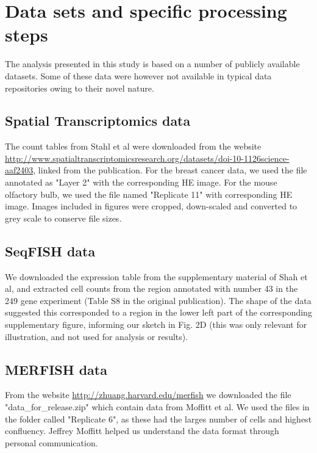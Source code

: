 \section{Data sets and specific processing steps}
The analysis presented in this study is based on a number of publicly available datasets. Some of these data were however not available in typical data repositories owing to their novel nature.

\subsection{Spatial Transcriptomics data}

\begin{sloppypar}
The count tables from Stahl et al were downloaded from the website \url{http://www.spatialtranscriptomicsresearch.org/datasets/doi-10-1126science-aaf2403}, linked from the publication. For the breast cancer data, we used the file annotated as "Layer 2" with the corresponding HE image. For the mouse olfactory bulb, we used the file named "Replicate 11" with corresponding HE image. Images included in figures were cropped, down-scaled and converted to grey scale to conserve file sizes.
\end{sloppypar}

\subsection{SeqFISH data}

We downloaded the expression table from the supplementary material of Shah et al, and extracted cell counts from the region annotated with number 43 in the 249 gene experiment (Table S8 in the original publication). The shape of the data suggested this corresponded to a region in the lower left part of the corresponding supplementary figure, informing our sketch in Fig. 2D (this was only relevant for illustration, and not used for analysis or results).

\subsection{MERFISH data}

From the website \url{http://zhuang.harvard.edu/merfish} we downloaded the file "data\_for\_release.zip" which contain data from Moffitt et al. We used the files in the folder called "Replicate 6", as these had the larges number of cells and highest confluency. Jeffrey Moffitt helped us understand the data format through personal communication.


